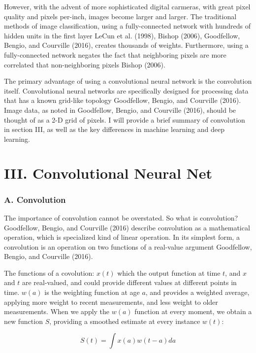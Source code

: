 \documentclass[conference,final,]{IEEEtran}
\begin{document}
However, with the advent of more sophisticated digital carmeras, with
great pixel quality and pixels per-inch, images become larger and
larger. The traditional methods of image classification, using a
fully-connected network with hundreds of hidden units in the first layer
LeCun et al. (1998), Bishop (2006), Goodfellow, Bengio, and Courville
(2016), creates thousands of weights. Furthermore, using a
fully-connected network negates the fact that neighboring pixels are
more correlated that non-neighboring pixels Bishop (2006).

The primary advantage of using a convolutional neural network is the
convolution itself. Convolutional neural networks are specifically
designed for processing data that has a known grid-like topology
Goodfellow, Bengio, and Courville (2016). Image data, as noted in
Goodfellow, Bengio, and Courville (2016), should be thought of as a 2-D
grid of pixels. I will provide a brief summary of convolution in section
III, as well as the key differences in machine learning and deep
learning.

\section{III. Convolutional Neural
Net}\label{iii.-convolutional-neural-net}

\subsubsection{A. Convolution}\label{a.-convolution}

The importance of convolution cannot be overstated. So what is
convolution? Goodfellow, Bengio, and Courville (2016) describe
convolution as a mathematical operation, which is specialized kind of
linear operation. In its simplest form, a convolution is an operation on
two functions of a real-value argument Goodfellow, Bengio, and Courville
(2016).

The functions of a covolution: \(x(t)\) which the output function at
time \(t\), and \(x\) and \(t\) are real-valued, and could provide
different values at different points in time. \(w(a)\) is the weighting
function at age \(a\), and provides a weighted average, applying more
weight to recent measurements, and less weight to older measurements.
When we apply the \(w(a)\) function at every moment, we obtain a new
function \(S\), providing a smoothed estimate at every instance
\(w(t)\):

\begin{equation}
    S(t) = \int x(a)w(t-a)da
\end{equation}
\end{document}
